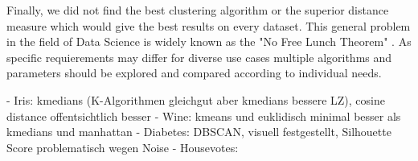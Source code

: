 Finally, we did not find the best clustering algorithm or the superior distance measure which would give the best results on every dataset. This general problem in the field of Data Science is widely known as the "No Free Lunch Theorem" \cite{nofreelunch}. As specific requierements may differ for diverse use cases multiple algorithms and parameters should be explored and compared according to individual needs. 

- Iris: kmedians (K-Algorithmen gleichgut aber kmedians bessere LZ), cosine distance offentsichtlich besser
- Wine: kmeans und euklidisch minimal besser als kmedians und manhattan
- Diabetes: DBSCAN, visuell festgestellt, Silhouette Score problematisch wegen Noise  
- Housevotes: 